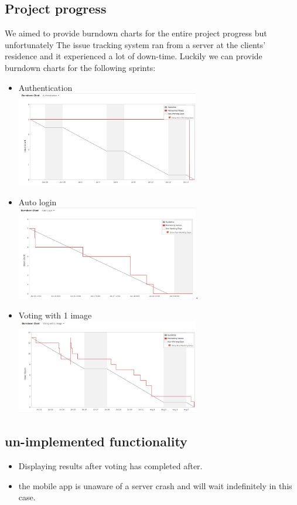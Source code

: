 \documentclass[10pt,a4paper]{article}
\begin{document}
\subsection{Project progress}
We aimed to provide burndown charts for the entire project progress but unfortunately The issue tracking system ran from a server at the clients' residence and it experienced a lot of down-time. Luckily we can provide burndown charts for the following sprints:
\begin{itemize}
\item Authentication\\
\includegraphics[width=80mm]{Pictures/Auth.png}
\item Auto login\\
\includegraphics[width=80mm]{Pictures/ALchart.png}.
\item Voting with 1 image\\
\includegraphics[width=80mm]{Pictures/v1i.png}
\end{itemize}
\subsection{un-implemented functionality}
\begin{itemize}
\item Displaying results after voting has completed after.
\item the mobile app is unaware of a server crash and will wait indefinitely in this case.
\end{itemize}
\end{document}
